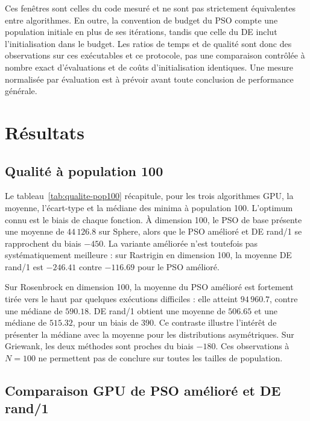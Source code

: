 \documentclass[conference]{IEEEtran}
\newcommand{\PSO}{\textsc{PSO}}
\newcommand{\DE}{\textsc{DE}}
\begin{document}
Ces fenêtres sont celles du code mesuré et ne sont pas strictement
équivalentes entre algorithmes. En outre, la convention de budget du \PSO{}
compte une population initiale en plus de ses itérations, tandis que celle du
\DE{} inclut l'initialisation dans le budget. Les ratios de temps et de
qualité sont donc des observations sur ces exécutables et ce protocole, pas
une comparaison contrôlée à nombre exact d'évaluations et de coûts
d'initialisation identiques. Une mesure normalisée par évaluation est à
prévoir avant toute conclusion de performance générale.

\section{Résultats}
\label{sec:results}

\subsection{Qualité à population 100}
\label{sec:quality}

Le tableau~\ref{tab:qualite-pop100} récapitule, pour les trois algorithmes
GPU, la moyenne, l'écart-type et la médiane des minima à population 100.
L'optimum connu est le biais de chaque fonction. À dimension 100, le PSO de
base présente une moyenne de $44\,126.8$ sur Sphere, alors que le PSO amélioré
et DE rand/1 se rapprochent du biais $-450$. La variante améliorée n'est
toutefois pas systématiquement meilleure : sur Rastrigin en dimension 100,
la moyenne DE rand/1 est $-246.41$ contre $-116.69$ pour le PSO amélioré.

Sur Rosenbrock en dimension 100, la moyenne du PSO amélioré est fortement
tirée vers le haut par quelques exécutions difficiles : elle atteint
$94\,960.7$, contre une médiane de $590.18$. DE rand/1 obtient une moyenne de
$506.65$ et une médiane de $515.32$, pour un biais de $390$. Ce contraste
illustre l'intérêt de présenter la médiane avec la moyenne pour les
distributions asymétriques. Sur Griewank, les deux méthodes sont proches du
biais $-180$. Ces observations à $N=100$ ne permettent pas de conclure sur
toutes les tailles de population.



\subsection{Comparaison GPU de PSO amélioré et DE rand/1}
\label{sec:pso-de}
\end{document}
